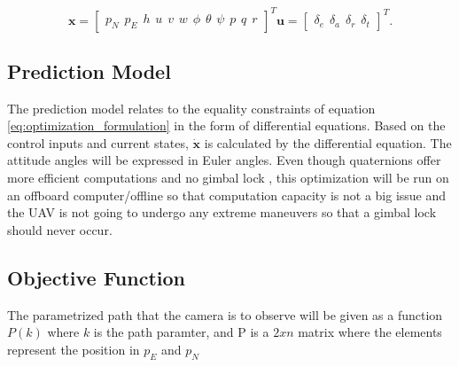 \begin{subequations}
\begin{equation}
	\mathbf{x} =
	\begin{bmatrix}
		p_N \hspace{5pt} p_E \hspace{5pt} h \hspace{5pt}
		u \hspace{5pt} v \hspace{5pt} w \hspace{5pt}
		\phi \hspace{5pt} \theta \hspace{5pt} \psi \hspace{5pt}
		p \hspace{5pt} q \hspace{5pt} r
	\end{bmatrix}^T
\end{equation}
\begin{equation}
	\mathbf{u} =
	\begin{bmatrix}
		\delta_e \hspace{5pt} \delta_a \hspace{5pt} \delta_r \hspace{5pt} \delta_t
	\end{bmatrix}^T.
\end{equation}
\end{subequations}


\subsection{Prediction Model}

The prediction model relates to the equality constraints of equation \ref{eq:optimization_formulation} in the form of differential equations. Based on the control inputs and current states, $\mathbf{\dot{x}}$ is calculated by the differential equation. The attitude angles will be expressed in Euler angles. Even though quaternions offer more efficient computations and no gimbal lock \cite{uavBEARD}, this optimization will be run on an offboard computer/offline so that computation capacity is not a big issue and the UAV is not going to undergo any extreme maneuvers so that a gimbal lock should never occur.


\subsection{Objective Function}

The parametrized path that the camera is to observe will be given as a function $P(k)$ where $k$ is the path paramter, and P is a $2xn$ matrix where the elements represent the position in $p_E$ and $p_N$

